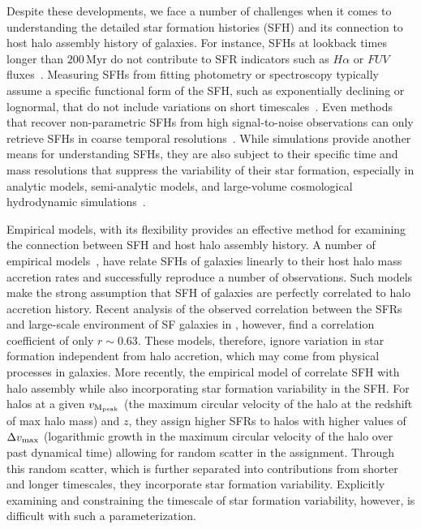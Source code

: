 \documentclass[12pt, letterpaper, preprint, tighten]{aastex62}
\begin{document}
Despite these developments, we face a number of challenges when it comes
to understanding the detailed star formation histories (SFH) and its
connection to host halo assembly history of galaxies.
For instance, SFHs at lookback times longer than $200\,\mathrm{Myr}$
do not contribute to SFR indicators such as $H\alpha$ or $FUV$ fluxes~\cite{sparre2017}.
Measuring SFHs from fitting photometry or spectroscopy typically
assume a specific functional form of the SFH, such as exponentially
declining or lognormal, that do not include variations on short
timescales~\citep[\emph{e.g.}][]{wilkinson2017, carnall2018}.
Even methods that recover non-parametric SFHs from high signal-to-noise
observations can only retrieve SFHs in coarse temporal resolutions~\citep[\emph{e.g.}][]{tojeiro2009, leja2018a}.
While simulations provide another means for understanding SFHs,
they are also subject to their specific time and mass resolutions that
suppress the variability of their star formation, especially in
analytic models, semi-analytic models, and large-volume cosmological
hydrodynamic simulations~\citep[][see also Figure~\ref{fig:illustris_sfh}]{sparre2015, sparre2017}.

Empirical models, with its flexibility provides an effective method for
examining the connection between SFH and host halo assembly history. A
number of empirical models~\citep{taghizadeh-popp2015, becker2015, rodriguez-puebla2016a, mitra2017, cohn2017, moster2017},
have relate SFHs of galaxies linearly to their host halo mass accretion
rates and successfully reproduce a number of observations. Such models
make the strong assumption that SFH of galaxies are perfectly correlated
to halo accretion history. Recent analysis of the observed correlation
between the SFRs and large-scale environment of SF galaxies in \cite{tinker2018b},
however, find a correlation coefficient of only $r \sim 0.63$. These models,
therefore, ignore variation in star formation independent from halo accretion,
which may come from physical processes in galaxies. More recently, the empirical
model of \cite{behroozi2018} correlate SFH
with halo assembly while also incorporating star formation variability in
the SFH. For halos at a given $v_{\rm M_{peak}}$ (the maximum circular
velocity of the halo at the redshift of max halo mass) and $z$, they
assign higher SFRs to halos with higher values of $\Delta v_{\rm max}$
(logarithmic growth in the maximum circular velocity of the halo over past dynamical time)
allowing for random scatter in the assignment. Through this random scatter,
which is further separated into contributions from shorter and longer timescales,
they incorporate star formation variability. Explicitly examining and constraining
the timescale of star formation variability, however, is difficult with such a
parameterization.
\end{document}

